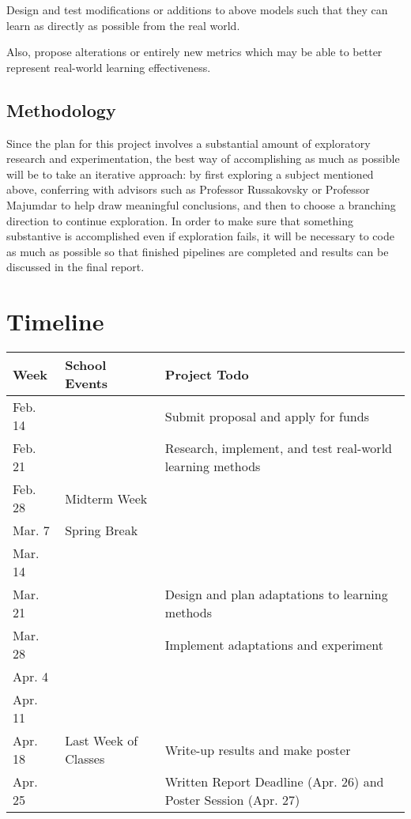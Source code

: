 \documentclass[10pt, letterpaper]{article}
\begin{document}
Design and test modifications or additions to above models such that they can learn as
directly as possible from the real world.

Also, propose alterations or entirely new metrics which may be able to better
represent real-world learning effectiveness.

\subsection{Methodology}

Since the plan for this project involves a substantial amount of exploratory
research and experimentation, the best way of accomplishing as much as possible
will be to take an iterative approach: by first exploring a subject mentioned
above, conferring with advisors such as Professor Russakovsky or Professor
Majumdar to help draw meaningful conclusions, and then to choose a branching
direction to continue exploration. In order to make sure that something
substantive is accomplished even if exploration fails, it will be necessary to
code as much as possible so that finished pipelines are completed and results
can be discussed in the final report.

\section{Timeline}

\begin{center}
	\begin{tabular}{ l l l }
		Week & School Events & Project Todo \\ \hline
		Feb. 14 & & Submit proposal and apply for funds \\
		Feb. 21 & & Research, implement, and test real-world learning methods \\
		Feb. 28 & Midterm Week & \\
		Mar. 7 & Spring Break & \\
		Mar. 14 & & \\
		Mar. 21 & & Design and plan adaptations to learning methods \\
		Mar. 28 & & Implement adaptations and experiment \\
		Apr. 4 & & \\
		Apr. 11 & & \\
		Apr. 18 & Last Week of Classes & Write-up results and make poster \\
		Apr. 25 & & Written Report Deadline (Apr. 26) and Poster Session (Apr. 27)
	\end{tabular} \\
\end{center}


\end{document}
